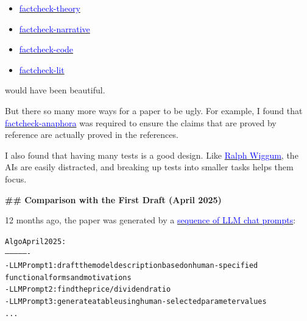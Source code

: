 \documentclass[12pt]{article}
\begin{document}
\begin{mdframed}[
linewidth=1pt,
linecolor=black,
innerleftmargin=0.25em,
innerrightmargin=0.25em,
innertopmargin=0.2\baselineskip,
innerbottommargin=0.8\baselineskip
]
\vspace{-2ex}
\begin{itemize}
\setlength{\itemsep}{0.15em}
\setlength{\parskip}{0pt}
\item \href{https://github.com/chenandrewy/ralph-wiggum-asset-pricing/blob/main/tests/factcheck-theory.py}{\textcolor{blue}{factcheck-theory}}
\item \href{https://github.com/chenandrewy/ralph-wiggum-asset-pricing/blob/main/tests/factcheck-narrative.py}{\textcolor{blue}{factcheck-narrative}}
\item \href{https://github.com/chenandrewy/ralph-wiggum-asset-pricing/blob/main/tests/factcheck-code.py}{\textcolor{blue}{factcheck-code}}
\item \href{https://github.com/chenandrewy/ralph-wiggum-asset-pricing/blob/main/tests/factcheck-lit.py}{\textcolor{blue}{factcheck-lit}}
\end{itemize}
\vspace{-2ex}

would have been beautiful.

But there so many more ways for a paper to be ugly. For example, I found that \href{https://github.com/chenandrewy/ralph-wiggum-asset-pricing/blob/main/tests/factcheck-anaphora.py}{\textcolor{blue}{factcheck-anaphora}} was required to ensure the claims that are proved by reference are actually proved in the references.

I also found that having many tests is a good design. Like \href{https://en.wikipedia.org/wiki/Ralph_Wiggum}{\textcolor{blue}{Ralph Wiggum}}, the AIs are easily distracted, and breaking up tests into smaller tasks helps them focus.

\par
{\large\bfseries \textcolor{red!70!black}{\#\# Comparison with the First Draft (April 2025)}}
\par

12 months ago, the paper was generated by a \href{https://github.com/chenandrewy/Prompts-to-Paper/}{\textcolor{blue}{sequence of LLM chat prompts}}:

\begin{mdframed}[backgroundcolor=gray!10,linewidth=0.6pt,linecolor=gray!70,roundcorner=2pt,innerleftmargin=0.6em,innerrightmargin=0.6em,innertopmargin=0.5\baselineskip,innerbottommargin=0.5\baselineskip]
\begingroup
\small
\setlength{\parindent}{0pt}
\setlength{\parskip}{0pt}
\begin{alltt}

Algo April 2025:
----------------
- LLM Prompt  1: draft the model description based on human-specified 
                 functional forms and motivations
- LLM Prompt  2: find the price/dividend ratio
- LLM Prompt  3: generate a table using human-selected parameter values 
...             
\end{alltt}
\endgroup
\end{mdframed}


\end{mdframed}
\end{document}
